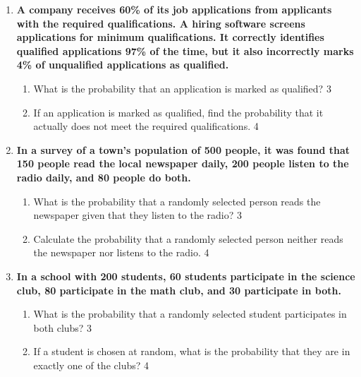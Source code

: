 \documentclass[a4paper,oneside, margin=1.4in]{book}
\begin{document}
\begin{enumerate}
  \begin{enumerate}
    \item
	What is a disjoint event? \hfill 1
    \item
	For two independent events, what does the Bayes' theorem reduce to? \hfill 2
    \item  
	What is the probability that a mail is tagged as spam?  \hfill 3
    \item
	If a certain mail is tagged as spam, find the probability that it is not a spam mail. \hfill 4
  \end{enumerate}
  
  \item
  \textbf{A company receives 60\% of its job applications from applicants with
  the required qualifications. A hiring software screens applications for minimum qualifications. It correctly identifies qualified applications 97\% of the time, but it also incorrectly marks 4\% of unqualified applications as qualified.}
  
  \begin{enumerate}
   \item  
    What is the probability that an application is marked as qualified? \hfill 3
   \item
    If an application is marked as qualified, find the probability that it actually does not meet the required qualifications. \hfill 4
  \end{enumerate}

\item
  \textbf{In a survey of a town's population of 500 people, it was found that 150 people read the local newspaper daily, 200 people listen to the radio daily, and 80 people do both.}
 
  \begin{enumerate}
    \item
    	What is the probability that a randomly selected person reads the newspaper given that they listen to the radio? \hfill 3
    \item
    	Calculate the probability that a randomly selected person neither reads the newspaper nor listens to the radio. \hfill 4
  \end{enumerate}

\item
  \textbf{In a school with 200 students, 60 students participate in the science 
  club, 80 participate in the math club, and 30 participate in both.}
 
  \begin{enumerate}
    \item
    	What is the probability that a randomly selected student participates in both clubs? \hfill 3
    \item
    	If a student is chosen at random, what is the probability that they are in exactly one of the clubs? \hfill 4
  \end{enumerate}


\end{enumerate}
\end{document}

